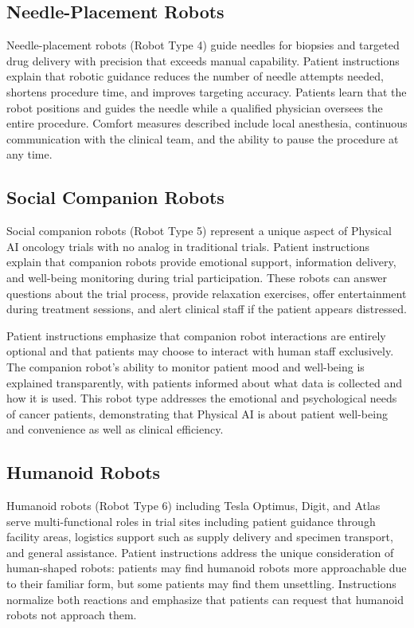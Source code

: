 \subsection{Needle-Placement Robots}
\label{subsec:instructions-needle}

Needle-placement robots (Robot Type 4) guide needles for biopsies and targeted
drug delivery with precision that exceeds manual capability. Patient
instructions explain that robotic guidance reduces the number of needle
attempts needed, shortens procedure time, and improves targeting accuracy.
Patients learn that the robot positions and guides the needle while a qualified
physician oversees the entire procedure. Comfort measures described include
local anesthesia, continuous communication with the clinical team, and the
ability to pause the procedure at any time.

\subsection{Social Companion Robots}
\label{subsec:instructions-companion}

Social companion robots (Robot Type 5) represent a unique aspect of Physical AI
oncology trials with no analog in traditional trials. Patient instructions
explain that companion robots provide emotional support, information delivery,
and well-being monitoring during trial participation. These robots can answer
questions about the trial process, provide relaxation exercises, offer
entertainment during treatment sessions, and alert clinical staff if the
patient appears distressed.

Patient instructions emphasize that companion robot interactions are entirely
optional and that patients may choose to interact with human staff exclusively.
The companion robot's ability to monitor patient mood and well-being is
explained transparently, with patients informed about what data is collected
and how it is used. This robot type addresses the emotional and psychological
needs of cancer patients, demonstrating that Physical AI is about patient
well-being and convenience as well as clinical efficiency.

\subsection{Humanoid Robots}
\label{subsec:instructions-humanoid}

Humanoid robots (Robot Type 6) including Tesla Optimus, Digit, and Atlas serve
multi-functional roles in trial sites including patient guidance through
facility areas, logistics support such as supply delivery and specimen
transport, and general assistance. Patient instructions address the unique
consideration of human-shaped robots: patients may find humanoid robots more
approachable due to their familiar form, but some patients may find them
unsettling. Instructions normalize both reactions and emphasize that patients
can request that humanoid robots not approach them.

